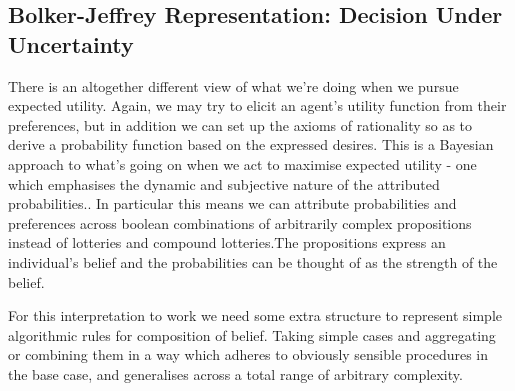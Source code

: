 \documentclass{tufte-handout}
\begin{document}
\subsection{Bolker-Jeffrey Representation: Decision Under Uncertainty}
There is an altogether different view of what we're doing when we pursue expected utility. Again, we may try to elicit an agent's utility function from their preferences, but in addition we can set up the axioms of rationality so as to derive a probability function based on the expressed desires. This is a Bayesian approach to what's going on when we act to maximise expected utility - one which emphasises the dynamic and subjective nature of the attributed probabilities.\cite{JeffreyDecision}. In particular this means we can attribute probabilities and preferences across boolean combinations of arbitrarily complex propositions instead of lotteries and compound lotteries.The propositions express an individual's belief and the probabilities can be thought of as the strength of the belief. 
\linebreak

\noindent For this interpretation to work we need some extra structure to represent simple algorithmic rules for composition of belief. Taking simple cases and aggregating or combining them in a way which adheres to obviously sensible procedures in the base case, and generalises across a total range of arbitrary complexity. 
\end{document}
